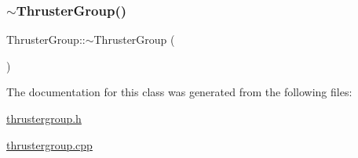 \subsubsection{\texorpdfstring{$\sim$\+Thruster\+Group()}{~ThrusterGroup()}}
{\footnotesize\ttfamily Thruster\+Group\+::$\sim$\+Thruster\+Group (\begin{DoxyParamCaption}{ }\end{DoxyParamCaption})}



The documentation for this class was generated from the following files\+:\begin{DoxyCompactItemize}
\item 
\mbox{\hyperlink{thrustergroup_8h}{thrustergroup.\+h}}\item 
\mbox{\hyperlink{thrustergroup_8cpp}{thrustergroup.\+cpp}}\end{DoxyCompactItemize}
